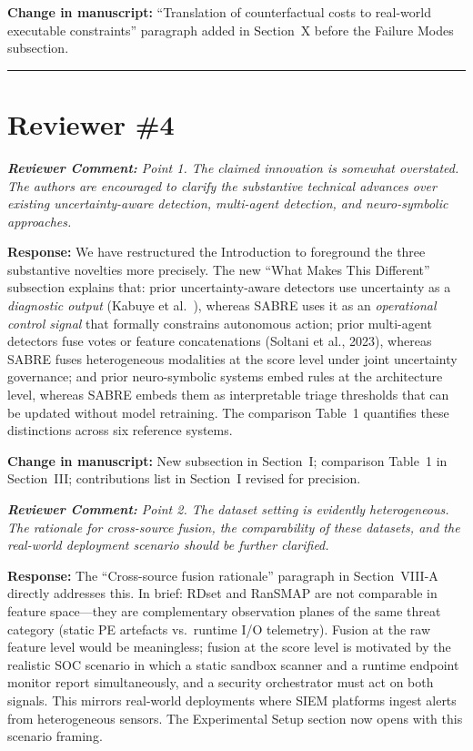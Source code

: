 \documentclass[11pt,a4paper]{article}
\newcommand{\RC}[1]{\begin{reviewbox}\textit{\textbf{Reviewer Comment:} #1}\end{reviewbox}}
\newcommand{\RS}[1]{\noindent\textcolor{responsegreen}{\textbf{Response:}} #1\par\medskip}
\newcommand{\CH}[1]{\noindent\textcolor{changebrown}{\textbf{Change in manuscript:}} #1\par\bigskip}
\begin{document}
\CH{``Translation of counterfactual costs to real-world executable constraints''
paragraph added in Section~X before the Failure Modes subsection.}

\bigskip
\hrule
\bigskip

\section{Reviewer \#4}

\RC{Point 1. The claimed innovation is somewhat overstated. The authors are encouraged
to clarify the substantive technical advances over existing uncertainty-aware
detection, multi-agent detection, and neuro-symbolic approaches.}

\RS{We have restructured the Introduction to foreground the three substantive
novelties more precisely. The new ``What Makes This Different'' subsection explains
that: prior uncertainty-aware detectors use uncertainty as a \emph{diagnostic
output} (Kabuye et al.~\cite{kabuye2025explainable}), whereas SABRE uses it as an
\emph{operational control signal} that formally constrains autonomous action;
prior multi-agent detectors fuse votes or feature concatenations (Soltani et al.,
2023), whereas SABRE fuses heterogeneous modalities at the score level under joint
uncertainty governance; and prior neuro-symbolic systems embed rules at the
architecture level, whereas SABRE embeds them as interpretable triage thresholds
that can be updated without model retraining. The comparison Table~1 quantifies
these distinctions across six reference systems.}

\CH{New subsection in Section~I; comparison Table~1 in Section~III; contributions
list in Section~I revised for precision.}

\RC{Point 2. The dataset setting is evidently heterogeneous. The rationale for
cross-source fusion, the comparability of these datasets, and the real-world
deployment scenario should be further clarified.}

\RS{The ``Cross-source fusion rationale'' paragraph in Section~VIII-A directly
addresses this. In brief: RDset and RanSMAP are not comparable in feature space---they
are complementary observation planes of the same threat category (static PE artefacts
vs.\ runtime I/O telemetry). Fusion at the raw feature level would be meaningless;
fusion at the score level is motivated by the realistic SOC scenario in which a
static sandbox scanner and a runtime endpoint monitor report simultaneously, and a
security orchestrator must act on both signals. This mirrors real-world deployments
where SIEM platforms ingest alerts from heterogeneous sensors. The Experimental Setup
section now opens with this scenario framing.}
\end{document}

